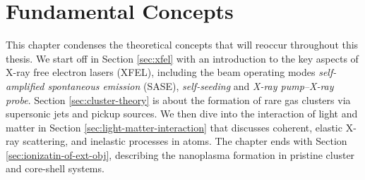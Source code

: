 \chapter{Fundamental Concepts}\label{ch:fundamental_concepts}
This chapter condenses the theoretical concepts that will reoccur throughout this thesis. We start off in Section \ref{sec:xfel} with an introduction to the key aspects of X-ray free electron lasers (XFEL), including the beam operating modes \textit{self-amplified spontaneous emission} (SASE), \textit{self-seeding} and \textit{X-ray pump--X-ray probe}. Section \ref{sec:cluster-theory} is about the formation of rare gas clusters via supersonic jets and pickup sources. We then dive into the interaction of light and matter in Section \ref{sec:light-matter-interaction} that discusses coherent, elastic X-ray scattering, and inelastic processes in atoms. The chapter ends with Section \ref{sec:ionizatin-of-ext-obj}, describing the nanoplasma formation in pristine cluster and core-shell systems.
%
%
%
